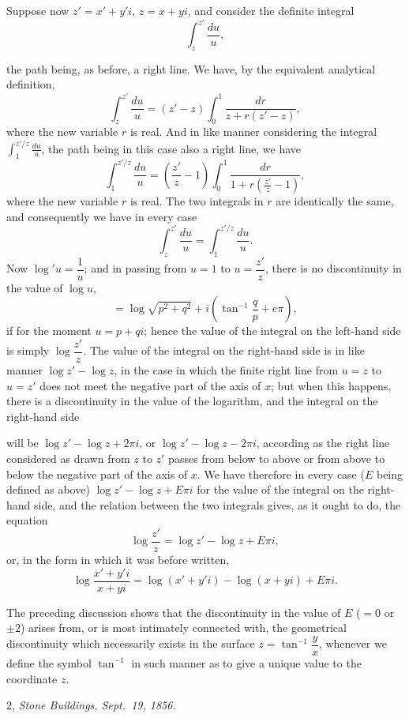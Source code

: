 \documentclass[11pt]{article}
\begin{document}
\medskip
Suppose now $z'=x'+y'i$, $z=x+yi$, and consider the definite integral
\[
\int_{z}^{z'}\!\frac{du}{u},
\]

\clearpage

the path being, as before, a right line. We have, by the equivalent analytical definition,
\[
\int_{z}^{z'}\!\frac{du}{u} = (z'-z)\int_{0}^{1}\!\frac{dr}{z+r(z'-z)},
\]
where the new variable $r$ is real. And in like manner considering the integral $\displaystyle\int_{1}^{z'/z}\!\frac{du}{u}$, the path being in this case also a right line, we have
\[
\int_{1}^{z'/z}\!\frac{du}{u} = \left(\frac{z'}{z}-1\right)\int_{0}^{1}\!\frac{dr}{1+r\!\left(\frac{z'}{z}-1\right)},
\]
where the new variable $r$ is real. The two integrals in $r$ are identically the same, and consequently we have in every case
\[
\int_{z}^{z'}\!\frac{du}{u}=\int_{1}^{z'/z}\!\frac{du}{u}.
\]
Now $\log'u=\dfrac{1}{u}$; and in passing from $u=1$ to $u=\dfrac{z'}{z}$, there is no discontinuity in the value of $\log u$,
\[
=\log\sqrt{p^{2}+q^{2}}+i\!\left(\tan^{-1}\frac{q}{p}+e\pi\right),
\]
if for the moment $u=p+qi$; hence the value of the integral on the left-hand side is simply $\log\dfrac{z'}{z}$. The value of the integral on the right-hand side is in like manner $\log z' - \log z$, in the case in which the finite right line from $u=z$ to $u=z'$ does not meet the negative part of the axis of $x$; but when this happens, there is a discontinuity in the value of the logarithm, and the integral on the right-hand side

\clearpage

will be $\log z' - \log z + 2\pi i$, or $\log z' - \log z - 2\pi i$, according as the right line considered as drawn from $z$ to $z'$ passes from below to above or from above to below the negative part of the axis of $x$. We have therefore in every case ($E$ being defined as above) $\log z' - \log z + E\pi i$ for the value of the integral on the right-hand side, and the relation between the two integrals gives, as it ought to do, the equation
\[
\log\frac{z'}{z}=\log z' - \log z + E\pi i,
\]
or, in the form in which it was before written,
\[
\log\frac{x'+y'i}{x+yi}=\log(x'+y'i)-\log(x+yi)+E\pi i.
\]

The preceding discussion shows that the discontinuity in the value of $E$ ($=0$ or $\pm 2$) arises from, or is most intimately connected with, the geometrical discontinuity which necessarily exists in the surface $z=\tan^{-1}\dfrac{y}{x}$, whenever we define the symbol $\tan^{-1}$ in such manner as to give a unique value to the coordinate $z$.

\medskip
\hfill 2, \emph{Stone Buildings, Sept.\ 19, 1856.}
\end{document}
